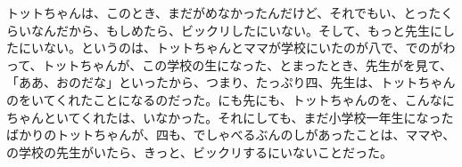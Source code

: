                                                                                                                                                                                                                                                                                                                                                                                                                                                                                                                                                                                                                                                                           トットちゃんは、このとき、まだがめなかったんだけど、それでもい、とったくらいなんだから、もしめたら、ビックリしたにいない。そして、もっと先生にしたにいない。というのは、トットちゃんとママが学校にいたのが八で、でのがわって、トットちゃんが、この学校の生になった、とまったとき、先生がを見て、「ああ、おのだな」といったから、つまり、たっぷり四、先生は、トットちゃんのをいてくれたことになるのだった。にも先にも、トットちゃんのを、こんなにちゃんといてくれたは、いなかった。それにしても、まだ小学校一年生になったばかりのトットちゃんが、四も、でしゃべるぶんのしがあったことは、ママや、の学校の先生がいたら、きっと、ビックリするにいないことだった。

